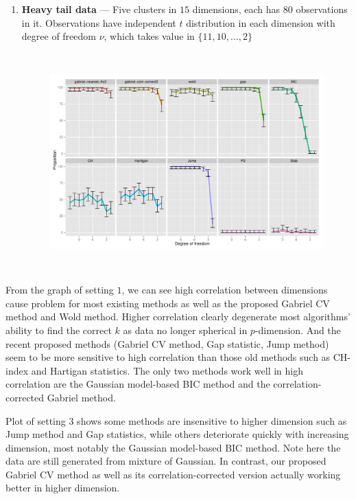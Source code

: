\documentclass[12pt]{article}
\begin{document}
\begin{enumerate}
	\item \textbf{Heavy tail data} --- Five clusters in $15$ dimensions, each has
     $80$ observations in it. Observations have independent $t$ distribution in each dimension  
     with degree of freedom $\nu$, which takes value in $\{11,10,...,2\}$
     
	\begin{figure}[H]
	\centering
	\includegraphics[width=5.5in, height=3.3in]{demo/bench/setting5/Facet.pdf}
	\label{fig:setting4}
	\end{figure}
\end{enumerate}

From the graph of setting $1$, we can see high correlation between dimensions cause problem for most 
existing methods as well as the proposed Gabriel CV method and Wold method. Higher correlation clearly 
degenerate most algorithms' ability to find the correct $k$ as data no longer spherical in $p$-dimension.
And the recent proposed methods (Gabriel CV method, Gap statistic, Jump method) seem to be more sensitive to
high correlation than those old methods such as CH-index and Hartigan statistics. The only two methods 
work well in high correlation are the Gaussian model-based BIC method \citep{fraley2002model} and the 
correlation-corrected Gabriel method. 

Plot of setting $3$ shows some methods are insensitive to higher dimension such as Jump method and Gap 
statistics, while others deteriorate quickly with increasing dimension, most notably the Gaussian 
model-based BIC method. Note here the data are still generated from mixture of Gaussian. In contrast, our 
proposed Gabriel CV method as well as its correlation-corrected version actually working better in higher 
dimension. 
\end{document}
